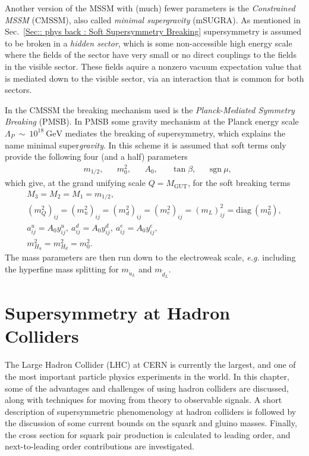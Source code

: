 \documentclass[twoside,english]{uiofysmaster}
\begin{document}
{Another version of the MSSM with (much) fewer parameters is the \textit{Constrained MSSM} (CMSSM), also called \textit{minimal supergravity} (mSUGRA). As mentioned in Sec.~\ref{Sec:: phys back : Soft Supersymmetry Breaking} supersymmetry is assumed to be broken in a \textit{hidden sector}, which is some non-accessible high energy scale where the fields of the sector have very small or no direct couplings to the fields in the visible sector. These fields aquire a nonzero vacuum expectation value that is mediated down to the visible sector, via an interaction that is common for both sectors. 

In the CMSSM the breaking mechanism used is the \textit{Planck-Mediated Symmetry Breaking} (PMSB). In PMSB some gravity mechanism at the Planck energy scale $\Lambda_P~\sim~10^{18}~\mathrm{GeV}$ mediates the breaking of supersymmetry, which explains the name minimal super\textit{gravity}. In this scheme it is assumed that soft terms only provide the following four (and a half) parameters
\begin{align}
&m_{1/2}, &&m_0^2, &&A_0, &&\tan \beta, &&\mathrm{sgn}~ \mu,
\end{align}
which give, at the grand unifying scale $Q=M_{\mathrm{GUT}}$, for the soft breaking terms
\begin{align}
M_3 = M_2 = M_1 = m_{1/2},\\
(m_Q^2)_{ij} = (m_u^2)_{ij} = (m_d^2)_{ij} = (m_e^2)_{ij} = (m_L)^2_{ij} = \mathrm{diag}~ (m_0^2),\\
a^u_{ij} = A_0 y_{ij}^u, ~a^d_{ij} = A_0 y_{ij}^d,~a^e_{ij} = A_0 y^e_{ij},\\
m_{H_u}^2 = m_{H_d}^2 = m_0^2.
\end{align}
The mass parameters are then run down to the electroweak scale, \textit{e.g.} including the hyperfine mass splitting for $m_{\widetilde{u}_L}$ and $m_{\widetilde{d}_L}$.





\chapter{Supersymmetry at Hadron Colliders}\label{Chapter:Supersymmetry at Hadron Colliders}



The Large Hadron Collider (LHC) at CERN is currently the largest, and one of the most important particle physics experiments in the world. In this chapter, some of the advantages and challenges of using hadron colliders are discussed, along with techniques for moving from theory to observable signals. A short description of supersymmetric phenomenology at hadron colliders is followed by the discussion of some current bounds on the squark and gluino masses. Finally, the cross section for squark pair production is calculated to leading order, and next-to-leading order contributions are investigated.

}
\end{document}
